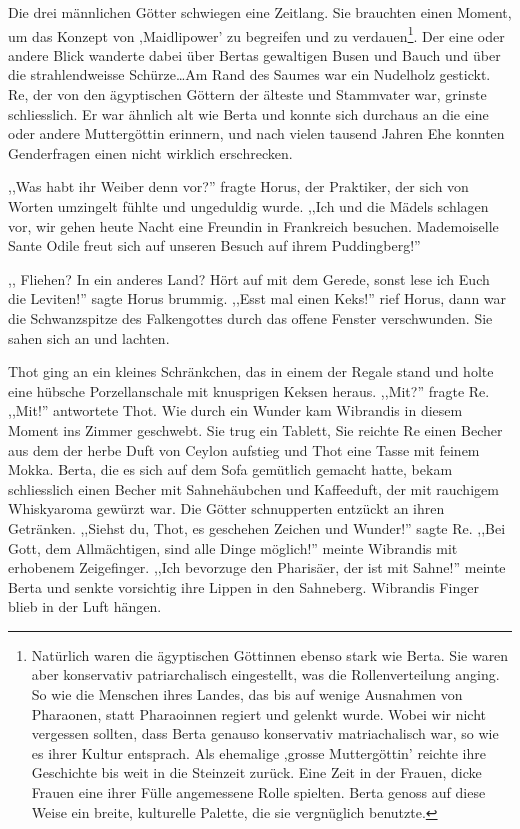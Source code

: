 \documentclass[11pt,titlepage,a5paper]{book}
\begin{document}
Die drei männlichen Götter schwiegen eine Zeitlang. Sie brauchten einen Moment, um das Konzept von ,Maidlipower' zu begreifen und zu verdauen\footnote{Natürlich waren die ägyptischen Göttinnen ebenso stark wie Berta. Sie waren aber konservativ patriarchalisch eingestellt, was die Rollenverteilung anging. So wie die Menschen ihres Landes, das bis auf wenige Ausnahmen von Pharaonen, statt Pharaoinnen regiert und gelenkt wurde. Wobei wir nicht vergessen sollten, dass Berta genauso konservativ matriachalisch war, so wie es ihrer Kultur entsprach. Als ehemalige ,grosse Muttergöttin' reichte ihre Geschichte bis weit in die Steinzeit zurück. Eine Zeit in der Frauen, dicke Frauen eine ihrer Fülle angemessene Rolle spielten. Berta genoss auf diese Weise ein breite, kulturelle Palette, die sie vergnüglich benutzte.}. Der eine oder andere Blick wanderte dabei über Bertas gewaltigen Busen und Bauch und über die strahlendweisse Schürze\dots Am Rand des Saumes war ein Nudelholz gestickt. Re, der von den ägyptischen Göttern der älteste und Stammvater war, grinste schliesslich. Er war ähnlich alt wie Berta und konnte sich durchaus an die eine oder andere Muttergöttin erinnern, und nach vielen tausend Jahren Ehe konnten Genderfragen einen nicht wirklich erschrecken.

,,Was habt ihr Weiber denn vor?'' fragte Horus, der Praktiker, der sich von Worten umzingelt fühlte und ungeduldig wurde. ,,Ich und die Mädels schlagen vor, wir gehen heute Nacht eine Freundin in Frankreich besuchen. Mademoiselle Sante Odile freut sich auf unseren Besuch auf ihrem Puddingberg!'' 

,, Fliehen? In ein anderes Land? Hört auf mit dem Gerede, sonst lese ich Euch die Leviten!'' sagte Horus brummig. ,,Esst mal einen Keks!''  rief Horus, dann war die Schwanzspitze des Falkengottes durch das offene Fenster verschwunden. Sie sahen sich an und lachten.

Thot ging an ein kleines Schränkchen, das in einem der Regale stand und holte eine hübsche Porzellanschale mit knusprigen Keksen heraus. ,,Mit?'' fragte Re. ,,Mit!'' antwortete Thot. Wie durch ein Wunder kam Wibrandis in diesem Moment ins Zimmer geschwebt. Sie trug ein Tablett, Sie reichte Re einen Becher aus dem der herbe Duft von Ceylon aufstieg und Thot eine Tasse mit feinem Mokka. Berta, die es sich auf dem Sofa gemütlich gemacht hatte, bekam schliesslich einen Becher mit Sahnehäubchen und Kaffeeduft, der mit rauchigem Whiskyaroma gewürzt war. Die Götter schnupperten entzückt an ihren Getränken. ,,Siehst du, Thot, es geschehen Zeichen und Wunder!'' sagte Re. ,,Bei Gott, dem Allmächtigen, sind alle Dinge möglich!'' meinte Wibrandis mit erhobenem Zeigefinger. ,,Ich bevorzuge den Pharisäer, der ist mit Sahne!'' meinte Berta und senkte vorsichtig ihre Lippen in den Sahneberg. Wibrandis Finger blieb in der Luft hängen.
\end{document}
